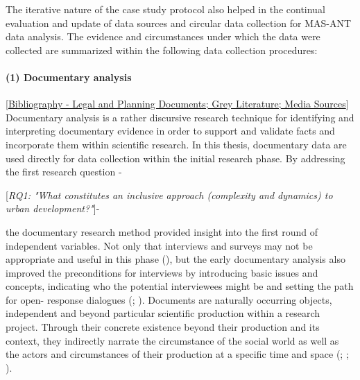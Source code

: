 \documentclass[11pt]{report}
\begin{document}
{{{{The iterative nature of the case study protocol also helped in the continual evaluation and update of data sources and circular data collection for MAS-ANT data analysis. The evidence and circumstances under which the data were collected are summarized within the following data collection procedures: 

\paragraph{(1) Documentary analysis} 
[\href{Bibliography}{Bibliography - Legal and Planning Documents; Grey Literature; Media Sources}]
\\

Documentary analysis is a rather discursive research technique for identifying and interpreting documentary evidence in order to support and validate facts and incorporate them within scientific research. In this thesis, documentary data are used directly for data collection within the initial research phase. By addressing the first research question -

[\textit{RQ1: "What constitutes an inclusive approach (complexity and dynamics) to urban development?"}]-

the documentary research method provided insight into the first round of independent variables.
Not only that interviews and surveys may not be appropriate and useful in this phase (\href{Mogalakwe}{\citealt{mogalakwe_use_2006}}), but the early documentary analysis also improved the preconditions for interviews by introducing basic issues and concepts, indicating who the potential interviewees might be and setting the path for open- response dialogues (\href{Robson}{\citealt{robson_real_1993}}; \href{Grubovic}{\citealt{grubovic_belgrade_2006}}).
Documents are naturally occurring objects, independent and beyond particular scientific production within a research project. Through their concrete existence beyond their production and its context, they indirectly narrate the circumstance of the social world as well as the actors and circumstances of their production at a specific time and space (\href{Jary}{\citealt{jary_harpercollins_1991}}; \href{Payne}{\citealt{payne_key_2004}}; \href{Mogalakwe}{\citealt{mogalakwe_use_2006}}).
\\

}}}}
\end{document}
